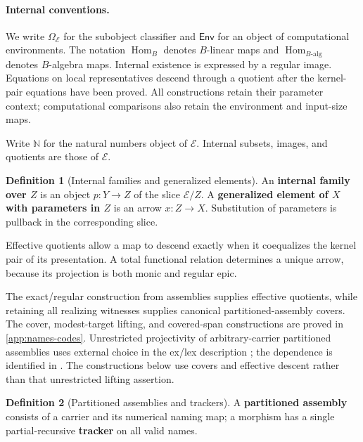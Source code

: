 \documentclass[11pt,a4paper]{article}
\numberwithin{algorithm}{section}
\numberwithin{equation}{section}
\theoremstyle{definition}
\newtheorem{definition}[definition]{Definition}
\theoremstyle{remark}
\theoremstyle{plain}
\newcommand{\E}{\mathcal E}
\newcommand{\Env}{\mathsf{Env}}
\newcommand{\Truth}{\Omega_{\E}}
\newcommand{\N}{\mathbb N}
\newcommand{\Hom}{\operatorname{Hom}}
\theoremstyle{definition}
\theoremstyle{plain}
\begin{document}
\paragraph{Internal conventions.}\label{sec:global-conventions}
We write $\Truth$ for the subobject classifier and $\Env$ for an
object of computational environments. The notation $\Hom_B$ denotes
$B$-linear maps and $\Hom_{B\text{-alg}}$ denotes $B$-algebra maps.
Internal existence is expressed by a regular image. Equations on local
representatives descend through a quotient after the kernel-pair
equations have been proved. All constructions retain their parameter
context; computational comparisons also retain the environment and
input-size maps.

Write $\N$ for the natural numbers object of $\E$. Internal subsets,
images, and quotients are those of $\E$. 

\begin{definition}[Internal families and generalized elements]\label{def:internal-families}
An \textbf{internal family over $Z$} is an object $p:Y\to Z$
of the slice $\E/Z$. A \textbf{generalized element of $X$ with
parameters in $Z$} is an arrow $x:Z\to X$. Substitution of
parameters is pullback in the corresponding slice.
\end{definition}

 Effective quotients allow a map
to descend exactly when it coequalizes the kernel pair of its
presentation. A total functional relation determines a unique arrow,
because its projection is both monic and regular epic.

The exact/regular construction from assemblies supplies effective
quotients, while retaining all realizing witnesses supplies canonical
partitioned-assembly covers. The cover, modest-target lifting, and
covered-span constructions are proved in \cref{app:names-codes}.
Unrestricted projectivity of arbitrary-carrier partitioned assemblies
uses external choice in the ex/lex description
\citep[Section 10.6]{Birkedal2000TypesComputability}; the dependence is
identified in \citet[Section 2.4]{Hofstra2003Completions}.
The constructions below use covers and effective descent rather than
that unrestricted lifting assertion.


\begin{definition}[Partitioned assemblies and trackers]\label{def:partitioned-assemblies}
A \textbf{partitioned assembly} consists of a carrier and its numerical naming
map; a morphism has a single partial-recursive \textbf{tracker} on all valid names.
\end{definition}
\end{document}
